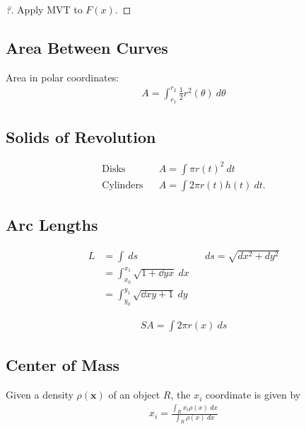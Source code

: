 \begin{proof}[?]

Apply MVT to \(F(x)\).

\end{proof}

\hypertarget{area-between-curves}{%
\subsection{Area Between Curves}\label{area-between-curves}}

Area in polar coordinates:
\begin{align*}
A = \int_{r_1}^{r_2} \frac{1}{2}r^2(\theta) ~d\theta
\end{align*}

\hypertarget{solids-of-revolution}{%
\subsection{Solids of Revolution}\label{solids-of-revolution}}

\begin{align*}  
\text{Disks} && A = \int \pi r(t)^2 ~dt \\
\text{Cylinders} && A = \int 2\pi r(t)h(t) ~dt
.\end{align*}

\hypertarget{arc-lengths}{%
\subsection{Arc Lengths}\label{arc-lengths}}

\begin{align*}
L 
&= \int ~ds  && ds = \sqrt{dx^2 + dy^2} \\
&= \int_{x_0}^{x_1}\sqrt{1 + \dd{y}{x}}~dx \\
&= \int_{y_0}^{y_1}\sqrt{\dd{x}{y} + 1}~dy
\end{align*}

\begin{align*}
SA = \int 2 \pi r(x) ~ds
\end{align*}

\hypertarget{center-of-mass}{%
\subsection{Center of Mass}\label{center-of-mass}}

Given a density \(\rho(\mathbf x)\) of an object \(R\), the \(x_i\)
coordinate is given by
\begin{align*}
x_i = 
\frac
{\displaystyle\int_R x_i\rho(x) ~dx}
{\displaystyle\int_R \rho(x)~dx}
\end{align*}


